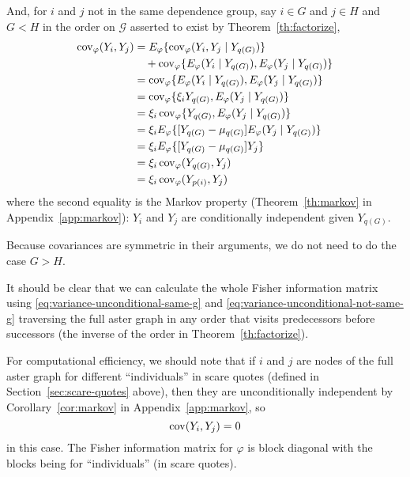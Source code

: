And, for $i$ and $j$ not in the same dependence group, say $i \in G$
and $j \in H$ and $G < H$ in the order on $\mathcal{G}$ asserted to exist
by Theorem~\ref{th:factorize},
\begin{equation}
\begin{split} \label{eq:variance-unconditional-not-same-g}
   \operatorname{cov}_\varphi(Y_i, Y_j)
   & =
   E_\varphi\{ \operatorname{cov}_\varphi(Y_i, Y_j \mid Y_{q(G)}) \}
   \\
   & \quad
   + \operatorname{cov}_\varphi\{E_\varphi(Y_i \mid Y_{q(G)}), E_\varphi(Y_j \mid Y_{q(G)})\}
   \\
   & =
   \operatorname{cov}_\varphi\{E_\varphi(Y_i \mid Y_{q(G)}), E_\varphi(Y_j \mid Y_{q(G)})\}
   \\
   & =
   \operatorname{cov}_\varphi\{\xi_i Y_{q(G)}, E_\varphi(Y_j \mid Y_{q(G)})\}
   \\
   & =
   \xi_i \operatorname{cov}_\varphi\{Y_{q(G)}, E_\varphi(Y_j \mid Y_{q(G)})\}
   \\
   & =
   \xi_i E_\varphi\{[Y_{q(G)} - \mu_{q(G)}] E_\varphi(Y_j \mid Y_{q(G)})\}
   \\
   & =
   \xi_i E_\varphi\{[Y_{q(G)} - \mu_{q(G)}] Y_j \}
   \\
   & =
   \xi_i \operatorname{cov}_\varphi(Y_{q(G)}, Y_j)
   \\
   & =
   \xi_i \operatorname{cov}_\varphi(Y_{p(i)}, Y_j)
\end{split}
\end{equation}
where the second equality is the Markov property (Theorem~\ref{th:markov}
in Appendix~\ref{app:markov}): $Y_i$ and $Y_j$ are conditionally independent
given $Y_{q(G)}$.

Because covariances are symmetric in their arguments, we do not need to
do the case $G > H$.

It should be clear that we can calculate the whole
Fisher information matrix using \eqref{eq:variance-unconditional-same-g}
and \eqref{eq:variance-unconditional-not-same-g} traversing the full
aster graph in any order that visits predecessors before successors
(the inverse of the order in Theorem~\ref{th:factorize}).

For computational efficiency, we should note that if $i$ and $j$ are
nodes of the full aster graph for different ``individuals'' in scare quotes
(defined in Section~\ref{sec:scare-quotes} above), then they are
unconditionally independent by Corollary~\ref{cor:markov}
in Appendix~\ref{app:markov}, so
$$
   \operatorname{cov}(Y_i, Y_j) = 0
$$
in this case.  The Fisher information matrix for $\varphi$ is block diagonal
with the blocks being for ``individuals'' (in scare quotes).

